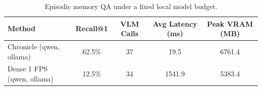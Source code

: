 \begin{table}[t]
  \centering
  \caption{Episodic memory QA under a fixed local model budget.}
  \label{tab:chronicle-vs-dense}
  \begin{tabular}{lcccc}
    \toprule
    Method & Recall@1 & VLM Calls & Avg Latency (ms) & Peak VRAM (MB) \\
    \midrule
    Chronicle (qwen, ollama) & 62.5\% & 37 & 19.5 & 6761.4 \\
    Dense 1 FPS (qwen, ollama) & 12.5\% & 34 & 1541.9 & 5383.4 \\
    \bottomrule
  \end{tabular}
\end{table}
